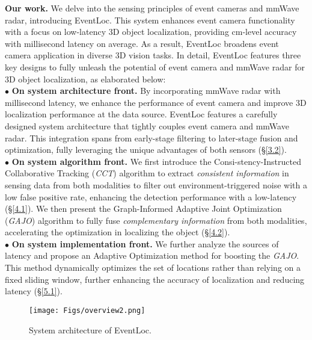 \noindent \textbf{Our work.}
We delve into the sensing principles of event cameras and mmWave radar, introducing EventLoc. 
This system enhances event camera functionality with a focus on low-latency 3D object localization, providing cm-level accuracy with millisecond latency on average. 
As a result, EventLoc broadens event camera application in diverse 3D vision tasks.
In detail, EventLoc features three key designs to fully unleash the potential of event camera and mmWave radar for 3D object localization, as elaborated below: \\
\noindent $\bullet$ \textbf{On system architecture front.}
By incorporating mmWave radar with millisecond latency, we enhance the performance of event camera and improve 3D localization performance at the data source.
EventLoc features a carefully designed system architecture that tightly couples event camera and mmWave radar. 
This integration spans from early-stage filtering to later-stage fusion and optimization, fully leveraging the unique advantages of both sensors (§\ref{3.2}). \\
\noindent $\bullet$ \textbf{On system algorithm front.}
We first introduce the Consi-stency-Instructed Collaborative Tracking (\textit{CCT}) algorithm to extract \textit{consistent information} in sensing data from both modalities to filter out environment-triggered noise with a low false positive rate, enhancing the detection performance with a low-latency (§\ref{4.1}). 
We then present the Graph-Informed Adaptive Joint Optimization (\textit{GAJO}) algorithm to fully fuse \textit{complementary information} from both modalities, accelerating the optimization in localizing the object (§\ref{4.2}). \\
\noindent $\bullet$ \textbf{On system implementation front.}
We further analyze the sources of latency and propose an Adaptive Optimization method for boosting the \textit{GAJO}. 
This method dynamically optimizes the set of locations rather than relying on a fixed sliding window, further enhancing the accuracy of localization and reducing latency (§\ref{5.1}).

\begin{figure*}[t]
    \setlength{\abovecaptionskip}{0.4cm} %
    \setlength{\belowcaptionskip}{-0.5cm}
    \setlength{\subfigcapskip}{-0.25cm}
    \centering
        \texttt{[image: Figs/overview2.png]}
        \vspace{-0.2cm}
    \caption{System architecture of EventLoc.}
    \label{overview}
\end{figure*} 

